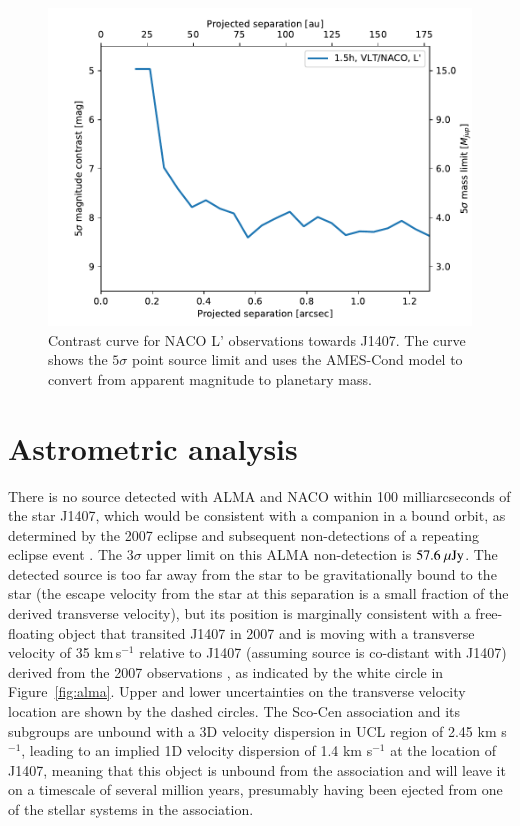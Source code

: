\documentclass[twocolumn]{aa} %
\newcommand{\kms}{km s$^{-1}$}
\begin{document}
\begin{figure}[tbh]
\begin{center}
  \includegraphics[width=\columnwidth]{J1407_L_prime_detection_limits_dusty_pca_5.pdf}
\caption{\label{fig:contrastc}Contrast curve for NACO L' observations towards J1407. The curve shows the $5\sigma$ point source limit and uses the AMES-Cond model to convert from apparent magnitude to planetary mass.}

\end{center}
\end{figure}%

\section{Astrometric analysis}\label{astrom} %

There is no source detected with ALMA and NACO within 100 milliarcseconds of the star J1407, which would be consistent with a companion in a bound orbit, as determined by the 2007 eclipse and subsequent non-detections of a repeating eclipse event \citep{Mentel18}.
%
The $3\sigma$ upper limit on this ALMA non-detection is $57.6{\rm~\mu Jy}$.
%
The detected source is too far away from the star to be gravitationally bound to the star (the escape velocity from the star at this separation is a small fraction of the derived transverse velocity), but its position is marginally consistent with a free-floating object that transited J1407 in 2007 and is moving with a transverse velocity of 35 km\,s$^{-1}$ relative to J1407 (assuming source is co-distant with J1407) derived from the 2007 observations \citep{Kenworthy15b}, as indicated by the white circle in Figure~\ref{fig:alma}.
%
Upper and lower uncertainties on the transverse velocity location are shown by the dashed circles.
%
The Sco-Cen association and its subgroups are unbound \citet{Wright18} with a 3D velocity dispersion in UCL region of 2.45 \kms{}, leading to an implied 1D velocity dispersion of 1.4 \kms{} at the location of J1407, meaning that this object is unbound from the association and will leave it on a timescale of several million years, presumably having been ejected from one of the stellar systems in the association.
\end{document}
